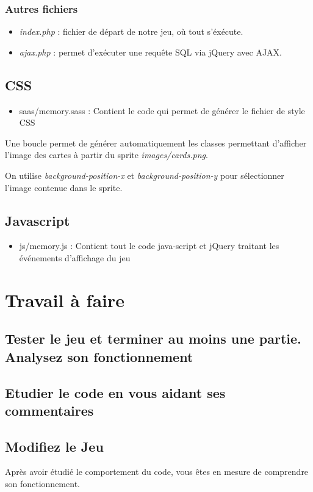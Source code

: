 \documentclass[a4paper,french,12pt]{article}
\begin{document}
\subsubsection{Autres fichiers}
\begin{itemize}
	\item \textit{index.php} : fichier de départ de notre jeu, où tout s'éxécute.
	\item \textit{ajax.php} : permet d'exécuter une requête SQL via jQuery avec AJAX.
\end{itemize}

\subsection{CSS}
\begin{itemize}
	\item saas/memory.sass : Contient le code qui permet de générer le fichier de style CSS
\end{itemize}	
Une boucle permet de générer automatiquement les classes permettant d'afficher l'image des cartes à partir du sprite \textit{images/cards.png}.

On utilise \textit{background-position-x} et \textit{background-position-y} pour sélectionner l'image contenue dans le sprite.


\subsection{Javascript}
\begin{itemize}
	\item js/memory.js : Contient tout le code java-script et jQuery traitant les événements d'affichage du jeu
\end{itemize}

\section{Travail à faire}
\subsection{Tester le jeu et terminer au moins une partie. Analysez son fonctionnement}
\subsection{Etudier le code en vous aidant ses commentaires}
\subsection{Modifiez le Jeu}
Après avoir étudié le comportement du code, vous êtes en mesure de comprendre son fonctionnement.
\end{document}
